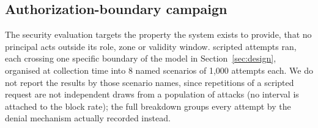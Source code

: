 \subsection{Authorization-boundary campaign}
\label{sec:results-security}

The security evaluation targets the property the system exists to provide, that no principal acts outside its role, zone or validity window. \SecurityAttemptsTotal{} scripted attempts ran, each crossing one specific boundary of the model in Section~\ref{sec:design}, organised at collection time into 8 named scenarios of 1,000 attempts each. We do not report the results by those scenario names, since repetitions of a scripted request are not independent draws from a population of attacks (no interval is attached to the block rate); the full breakdown groups every attempt by the denial mechanism actually recorded instead.

